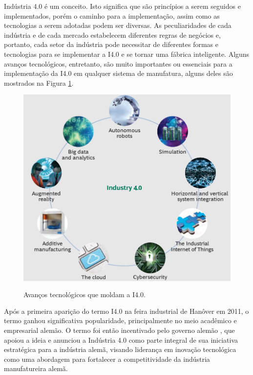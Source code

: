 \documentclass[
	12pt,				%
	oneside,			%
	a4paper,			%
	english,			%
	brazil				%
]{abntex2}
\begin{document}
	Indústria 4.0 é um conceito. Isto significa que são princípios a serem seguidos e implementados, porém o caminho para a implementação, assim como as tecnologias a serem adotadas podem ser diversas. As peculiaridades de cada indústria e de cada mercado estabelecem diferentes regras de negócios e, portanto, cada setor da indústria pode necessitar de diferentes formas e tecnologias para se implementar a I4.0 e se tornar uma fábrica inteligente. Alguns avanços tecnológicos, entretanto, são muito importantes ou essenciais para a implementação da I4.0 em qualquer sistema de manufatura, alguns deles são mostrados na Figura \ref{fig:tecnologias-i4}.
	
	\begin{figure}[H]
		\centering
		\caption{Avanços tecnológicos que moldam a I4.0.}
		\includegraphics[width=1\textwidth]{tecnologias-i4.png}
		\label{fig:tecnologias-i4}
	\end{figure}

	Após a primeira aparição do termo I4.0 na feira industrial de Hanôver em 2011, o termo ganhou significativa popularidade, principalmente no meio acadêmico e empresarial alemão. O termo foi então incentivado pelo governo alemão \cite{lasi2014industryfour, kagermann2013recommendations}, que apoiou a ideia e anunciou a Indústria 4.0 como parte integral de sua iniciativa estratégica para a indústria alemã, visando liderança em inovação tecnológica \cite{drath2014industrie} como uma abordagem para fortalecer a competitividade da indústria manufatureira alemã.	
\end{document}
